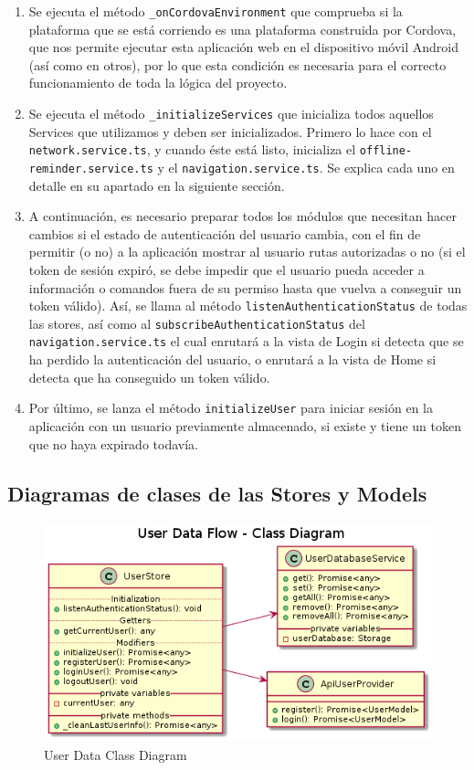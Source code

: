 \begin{enumerate}
\item Se ejecuta el método \verb|_onCordovaEnvironment| que comprueba si la plataforma que se está corriendo es una plataforma construida por Cordova, que nos permite ejecutar esta aplicación web en el dispositivo móvil Android (así como en otros), por lo que esta condición es necesaria para el correcto funcionamiento de toda la lógica del proyecto.
\item Se ejecuta el método \verb|_initializeServices| que inicializa todos aquellos Services que utilizamos y deben ser inicializados. Primero lo hace con el \verb|network.service.ts|, y cuando éste está listo, inicializa el \verb|offline-reminder.service.ts| y el \verb|navigation.service.ts|. Se explica cada uno en detalle en su apartado en la siguiente sección.
\item A continuación, es necesario preparar todos los módulos que necesitan hacer cambios si el estado de autenticación del usuario cambia, con el fin de permitir (o no) a la aplicación mostrar al usuario rutas autorizadas o no (si el token de sesión expiró, se debe impedir que el usuario pueda acceder a información o comandos fuera de su permiso hasta que vuelva a conseguir un token válido). Así, se llama al método \verb|listenAuthenticationStatus| de todas las stores, así como al \verb|subscribeAuthenticationStatus| del \verb|navigation.service.ts| el cual enrutará a la vista de Login si detecta que se ha perdido la autenticación del usuario, o enrutará a la vista de Home si detecta que ha conseguido un token válido.
\item Por último, se lanza el método \verb|initializeUser| para iniciar sesión en la aplicación con un usuario previamente almacenado, si existe y tiene un token que no haya expirado todavía.
\end{enumerate}

\subsection{Diagramas de clases de las Stores y Models}
\label{ch:Capitulo4.5.5}

\begin{figure}[hbt!]
\centering
\includegraphics[height=2.5in]{figures/diagrams/front/data-flow/user.png}
\caption[user]{User Data Class Diagram\footnotemark}
\end{figure}

